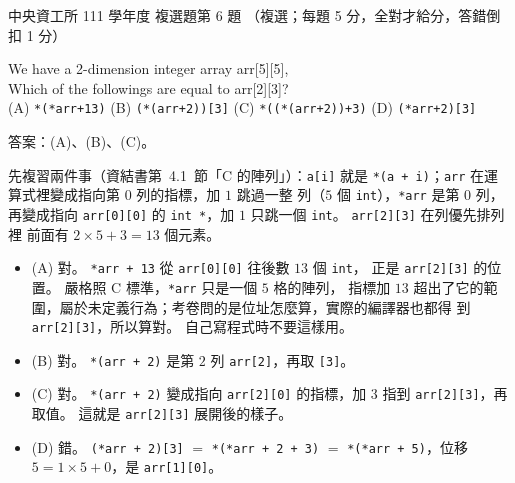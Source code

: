 \begin{pastexam}[label={px:ncu-111-dsa-06}]{中央資工所 111 學年度 複選題第 6 題}
（複選；每題 5 分，全對才給分，答錯倒扣 1 分）

We have a 2-dimension integer array arr[5][5],\\
Which of the followings are equal to arr[2][3]?\\
(A) \texttt{*(*arr+13)} \quad (B) \texttt{(*(arr+2))[3]} \quad
(C) \texttt{*((*(arr+2))+3)} \quad (D) \texttt{(*arr+2)[3]}
\end{pastexam}

\begin{pastsoln}
答案：(A)、(B)、(C)。

先複習兩件事（資結書第~4.1~節「C 的陣列」）：\texttt{a[i]} 就是
\texttt{*(a + i)}；\texttt{arr} 在運算式裡變成指向第 $0$ 列的指標，加 $1$ 跳過一整
列（$5$ 個 \texttt{int}），\texttt{*arr} 是第 $0$ 列，再變成指向 \texttt{arr[0][0]}
的 \texttt{int *}，加 $1$ 只跳一個 \texttt{int}。 \texttt{arr[2][3]} 在列優先排列裡
前面有 $2 \times 5 + 3 = 13$ 個元素。
\begin{itemize}
\item (A) 對。 \texttt{*arr + 13} 從 \texttt{arr[0][0]} 往後數 $13$ 個 \texttt{int}，
正是 \texttt{arr[2][3]} 的位置。 嚴格照 C 標準，\texttt{*arr} 只是一個 $5$ 格的陣列，
指標加 $13$ 超出了它的範圍，屬於未定義行為；考卷問的是位址怎麼算，實際的編譯器也都得
到 \texttt{arr[2][3]}，所以算對。 自己寫程式時不要這樣用。
\item (B) 對。 \texttt{*(arr + 2)} 是第 $2$ 列 \texttt{arr[2]}，再取 \texttt{[3]}。
\item (C) 對。 \texttt{*(arr + 2)} 變成指向 \texttt{arr[2][0]} 的指標，加 $3$ 指到
\texttt{arr[2][3]}，再取值。 這就是 \texttt{arr[2][3]} 展開後的樣子。
\item (D) 錯。 \texttt{(*arr + 2)[3]} $=$ \texttt{*(*arr + 2 + 3)} $=$
\texttt{*(*arr + 5)}，位移 $5 = 1 \times 5 + 0$，是 \texttt{arr[1][0]}。
\end{itemize}
\end{pastsoln}
